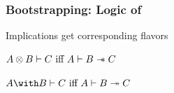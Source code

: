 \begin{frame}[c]
  \frametitle{Bootstrapping: Logic of \BI{}}
  \begin{center}
    Implications get corresponding flavors

    $A \otimes B \vdash C\ \text{iff}\ A \vdash B \mathrel{-\mkern-6mu*} C$

    $A \with B \vdash C\ \text{iff}\ A \vdash B \shimp C$
  \end{center}
\end{frame}


